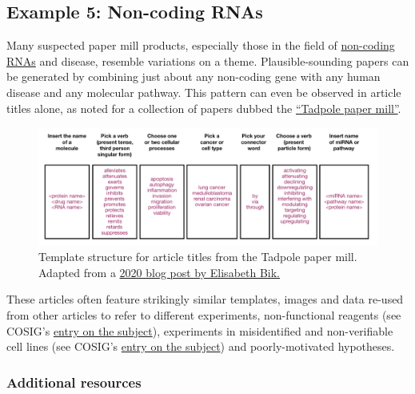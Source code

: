\documentclass[letterpaper, 12pt]{article}
\begin{document}
\subsection*{Example 5: Non-coding RNAs}

Many suspected paper mill products, especially those in the field of \href{https://en.wikipedia.org/wiki/Non-coding_RNA}{non-coding RNAs} and disease, resemble variations on a theme. Plausible-sounding papers can be generated by combining just about any non-coding gene with any human disease and any molecular pathway. This pattern can even be observed in article titles alone, as noted for a collection of papers dubbed the \href{https://scienceintegritydigest.com/2020/02/21/the-tadpole-paper-mill/}{``Tadpole paper mill''}.

\begin{figure}[h!tbp]
    \centering
    \includegraphics[width=\textwidth]{img/formulaic/tadpole-template.png}
    \caption*{Template structure for article titles from the Tadpole paper mill. Adapted from a \href{https://scienceintegritydigest.com/2020/02/21/the-tadpole-paper-mill/}{2020 blog post by Elisabeth Bik.}}
\end{figure}

These articles often feature strikingly similar templates, images and data re-used from other articles to refer to different experiments, non-functional reagents (see COSIG's \href{https://osf.io/2egvz}{entry on the subject}), experiments in misidentified and non-verifiable cell lines (see COSIG's \href{https://osf.io/d7we5}{entry on the subject}) and poorly-motivated hypotheses.

\subsubsection*{Additional resources}
\end{document}
